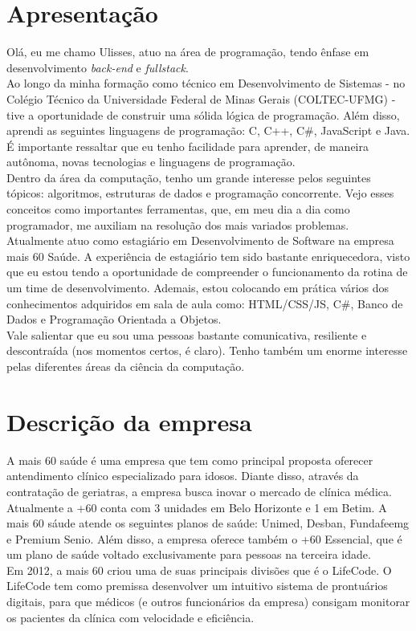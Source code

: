 \documentclass[12pt]{article}
\begin{document}
\newpage
{}
\section{Apresentação}
Olá, eu me chamo Ulisses, atuo na área de programação, tendo ênfase em desenvolvimento \emph{back-end} e \emph{fullstack}.
\\
Ao longo da minha formação como técnico em Desenvolvimento de Sistemas - no Colégio Técnico da Universidade Federal de Minas Gerais (COLTEC-UFMG) - tive a oportunidade de construir uma sólida lógica de programação. Além disso, aprendi as seguintes linguagens de programação: C, C++, C\#, JavaScript e Java. É importante ressaltar  que eu tenho facilidade para aprender, de maneira autônoma, novas tecnologias e linguagens de programação.
\\
Dentro da área da computação, tenho um grande interesse pelos seguintes tópicos: algoritmos, estruturas de dados e programação concorrente. Vejo esses conceitos como importantes ferramentas, que, em meu dia a dia como programador, me auxiliam na resolução dos mais variados problemas.
\\
Atualmente atuo como estagiário em Desenvolvimento de Software na empresa mais 60 Saúde. A experiência de estagiário tem sido bastante enriquecedora, visto que eu estou tendo a oportunidade de compreender o funcionamento da rotina de um time de desenvolvimento. Ademais, estou colocando em prática vários dos conhecimentos adquiridos em sala de aula como: HTML/CSS/JS, C\#, Banco de Dados e Programação Orientada a Objetos.
\\
Vale salientar que eu sou uma pessoas bastante comunicativa, resiliente e descontraída (nos momentos certos, é claro). Tenho também um enorme interesse pelas diferentes áreas da ciência da computação.

\section{Descrição da empresa}
A mais 60 saúde é uma empresa que tem como principal proposta oferecer antendimento clínico especializado para idosos. Diante disso, através da contratação de geriatras, a empresa busca inovar o mercado de clínica médica.
\\
Atualmente a +60 conta com 3 unidades em Belo Horizonte e 1 em Betim. A mais 60 sáude atende os seguintes planos de saúde: Unimed, Desban, Fundafeemg e Premium Senio. Além disso, a empresa oferece também o +60 Essencial, que é um plano de saúde voltado exclusivamente para pessoas na terceira idade. 
\\
Em 2012, a mais 60 criou uma de suas principais divisões que é o LifeCode. O LifeCode tem como premissa desenvolver um intuitivo sistema de prontuários digitais, para que médicos (e outros funcionários da empresa) consigam monitorar os pacientes da clínica com velocidade e eficiência.
\end{document}
